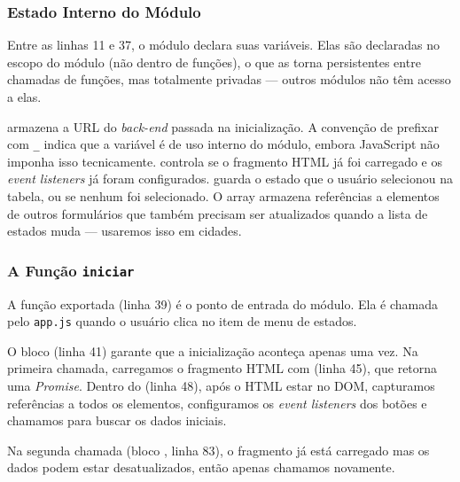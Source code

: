 
\subsubsection{Estado Interno do Módulo}

Entre as linhas 11 e 37, o módulo declara suas variáveis. Elas são declaradas no escopo do módulo (não dentro de funções), o que as torna persistentes entre chamadas de funções, mas totalmente privadas --- outros módulos não têm acesso a elas.

 armazena a URL do \textit{back-end} passada na inicialização. A convenção de prefixar com \texttt{\_} indica que a variável é de uso interno do módulo, embora JavaScript não imponha isso tecnicamente.  controla se o fragmento HTML já foi carregado e os \textit{event listeners} já foram configurados.  guarda o estado que o usuário selecionou na tabela, ou  se nenhum foi selecionado. O array  armazena referências a elementos  de outros formulários que também precisam ser atualizados quando a lista de estados muda --- usaremos isso em cidades.

\subsubsection{A Função \texttt{iniciar}}

A função exportada  (linha 39) é o ponto de entrada do módulo. Ela é chamada pelo \texttt{app.js} quando o usuário clica no item de menu de estados.

O bloco  (linha 41) garante que a inicialização aconteça apenas uma vez. Na primeira chamada, carregamos o fragmento HTML com  (linha 45), que retorna uma \textit{Promise}. Dentro do  (linha 48), após o HTML estar no DOM, capturamos referências a todos os elementos, configuramos os \textit{event listeners} dos botões e chamamos  para buscar os dados iniciais.

Na segunda chamada (bloco , linha 83), o fragmento já está carregado mas os dados podem estar desatualizados, então apenas chamamos  novamente.

